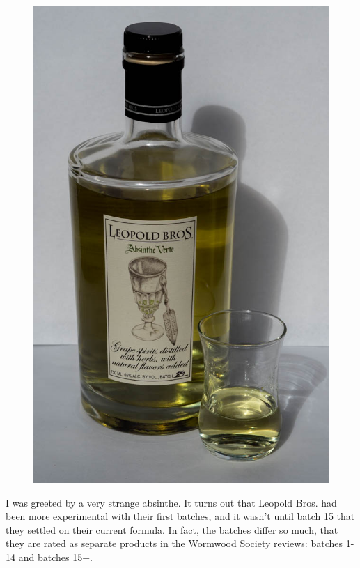 \documentclass[12pt,letterpaper,oneside]{memoir}
\begin{document}
  \begin{figure}
    \includegraphics[width=\linewidth]{../../assets/tasting/naa-leopold.jpg}
  \end{figure}

  I was greeted by a very strange absinthe.  It turns out that Leopold Bros. had been more experimental with their first batches, and it wasn't until batch 15 that they settled on their current formula.  In fact, the batches differ so much, that they are rated as separate products in the Wormwood Society reviews: \href{http://www.wormwoodsociety.org/index.php/component/content/article/20-absinthe-brand-reviews/traditional-absinthe/577-leopold-brothers-absinthe-verte-batches-1-14}{batches 1-14} and \href{http://www.wormwoodsociety.org/index.php/component/content/article/20-absinthe-brand-reviews/traditional-absinthe/439-leopold-brothers-absinthe-verte-batches-15}{batches 15+}.
\end{document}
